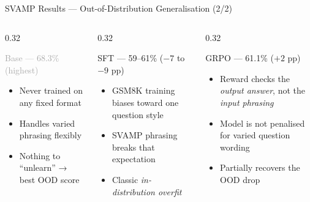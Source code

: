 \documentclass[aspectratio=169,10pt]{beamer}
\begin{document}
\begin{frame}{SVAMP Results — Out-of-Distribution Generalisation (2/2)}
  \begin{columns}[T]
    \begin{column}{0.32\textwidth}
      \begin{block}{\textcolor{darkgray}{Base — 68.3\% (highest)}}
        \begin{itemize}\small
          \item Never trained on any fixed format
          \item Handles varied phrasing flexibly
          \item Nothing to ``unlearn'' → best OOD score
        \end{itemize}
      \end{block}
    \end{column}
    \begin{column}{0.32\textwidth}
      \begin{block}{\textcolor{sftoran}{SFT — 59--61\% ($-7$ to $-9$ pp)}}
        \begin{itemize}\small
          \item GSM8K training biases toward one question style
          \item SVAMP phrasing breaks that expectation
          \item Classic \emph{in-distribution overfit}
        \end{itemize}
      \end{block}
    \end{column}
    \begin{column}{0.32\textwidth}
      \begin{block}{\textcolor{grpogre}{GRPO — 61.1\% ($+2$ pp)}}
        \begin{itemize}\small
          \item Reward checks the \emph{output answer}, not the \emph{input phrasing}
          \item Model is not penalised for varied question wording
          \item Partially recovers the OOD drop
        \end{itemize}
      \end{block}
    \end{column}
  \end{columns}
\end{frame}
\end{document}
